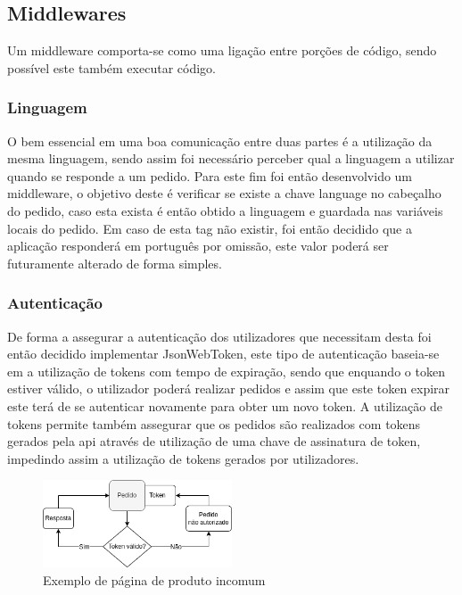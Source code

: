 \subsection{Middlewares} 
Um middleware comporta-se como uma ligação entre porções de código, sendo possível este também executar código.

\subsubsection{Linguagem}
O bem essencial em uma boa comunicação entre duas partes é a utilização da mesma linguagem, sendo assim foi necessário perceber qual a linguagem a utilizar quando se responde a um pedido. Para este fim foi então desenvolvido um middleware, o objetivo deste é verificar se existe a chave language no cabeçalho do pedido, caso esta exista é então obtido a linguagem e guardada nas variáveis locais do pedido. Em caso de esta tag não existir, foi então decidido que a aplicação responderá em português por omissão, este valor poderá ser futuramente alterado de forma simples.

\newpage

\subsubsection{Autenticação}
De forma a assegurar a autenticação dos utilizadores que necessitam desta foi então decidido implementar JsonWebToken, este tipo de autenticação baseia-se em a utilização de tokens com tempo de expiração, sendo que enquando o token estiver válido, o utilizador poderá realizar pedidos e assim que este token expirar este terá de se autenticar novamente para obter um novo token.
A utilização de tokens permite também assegurar que os pedidos são realizados com tokens gerados pela api através de utilização de uma chave de assinatura de token, impedindo assim a utilização de tokens gerados por utilizadores.
\begin{figure}[htb]
  \centering
  \includegraphics[width=0.5\textwidth]{images/implementacao/api/jwt_session.png}
  \caption{Exemplo de página de produto incomum}
  \label{fig:64}
\end{figure}

